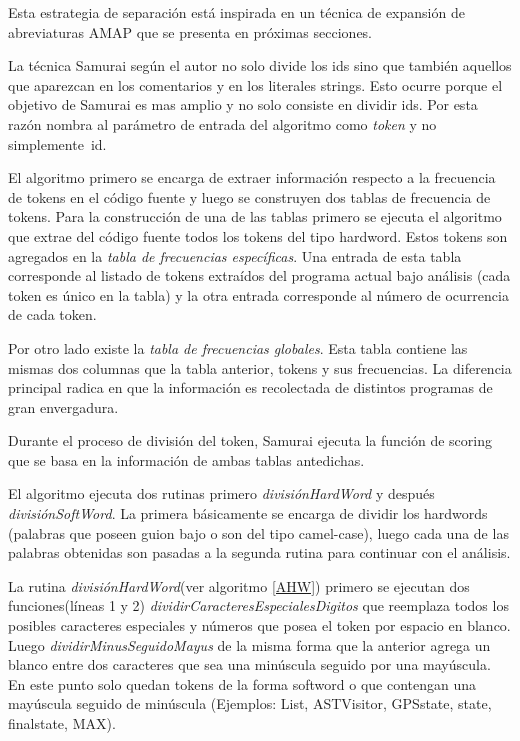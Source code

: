 \documentclass[a4paper,12pt]{report}
\begin{document}
Esta estrategia de separación está inspirada en un técnica de expansión de abreviaturas AMAP\cite{EZH08} que se presenta en próximas secciones.

La técnica Samurai según el autor\cite{EHPV09} no solo divide los ids sino que también aquellos que aparezcan en los comentarios y en los literales strings. Esto ocurre porque el objetivo de Samurai es mas amplio y no solo consiste en dividir ids. Por esta razón nombra al parámetro de entrada del algoritmo como \textit{token} y no \mbox{simplemente id.}

El algoritmo primero se encarga de extraer información respecto a la frecuencia de tokens en el código fuente y luego se construyen dos tablas de frecuencia de tokens. Para la construcción de una de las tablas primero se ejecuta el algoritmo que extrae del código fuente todos los tokens del tipo hardword. Estos tokens son agregados en la \textit{tabla de frecuencias específicas}. Una entrada de esta tabla corresponde al listado de tokens extraídos del programa actual bajo análisis (cada token es único en la tabla) y la otra entrada corresponde al número de ocurrencia de cada token. 

Por otro lado existe la \textit{tabla de frecuencias globales}. Esta tabla contiene las mismas dos columnas que la tabla anterior, tokens y sus frecuencias. La diferencia principal radica en que la información es recolectada de distintos programas de gran envergadura. 

Durante el proceso de división del token, Samurai ejecuta la función de scoring que se basa en la información de ambas tablas antedichas.


El algoritmo ejecuta dos rutinas primero \textit{divisiónHardWord} y después \mbox{\textit{divisiónSoftWord}}. La primera básicamente se encarga de dividir los hardwords (palabras que poseen guion bajo o son del tipo camel-case), luego cada una de las palabras obtenidas son pasadas a la segunda rutina para continuar con el análisis.

La rutina \textit{divisiónHardWord}(ver algoritmo \ref{AHW}) primero se ejecutan dos funciones(líneas 1 y 2) \textit{dividirCaracteresEspecialesDigitos} que reemplaza todos los posibles caracteres especiales y números que posea el token por espacio en blanco. Luego \mbox{\textit{dividirMinusSeguidoMayus}} de la misma forma que la anterior agrega un blanco entre dos caracteres que sea una minúscula seguido por una mayúscula. En este punto solo quedan tokens de la forma softword o que contengan una mayúscula seguido de minúscula (Ejemplos: \textsf{List, ASTVisitor, GPSstate, state, finalstate, MAX}).
\end{document}
